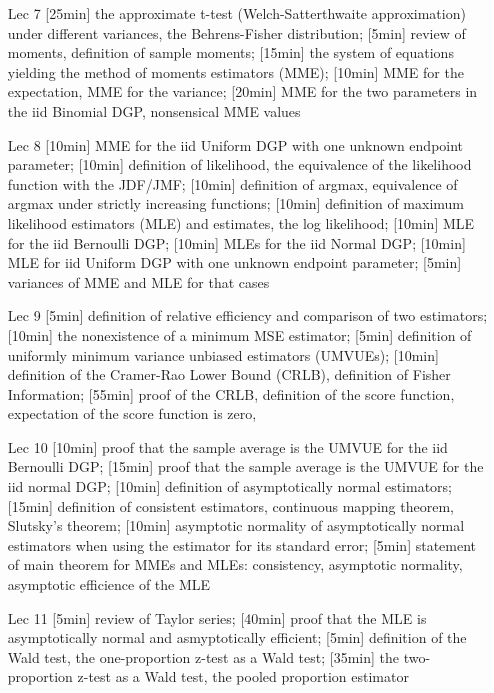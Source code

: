 \begin{enumerate}
\item[Lec 7] [25min] the approximate t-test (Welch-Satterthwaite approximation) under different variances, the Behrens-Fisher distribution; [5min] review of moments, definition of sample moments; [15min] the system of equations yielding the method of moments estimators (MME); [10min] MME for the expectation, MME for the variance; [20min] MME for the two parameters in the iid Binomial DGP, nonsensical MME values

\item[Lec 8] [10min] MME for the iid Uniform DGP with one unknown endpoint parameter; [10min] definition of likelihood, the equivalence of the likelihood function with the JDF/JMF; [10min] definition of argmax, equivalence of argmax under strictly increasing functions; [10min] definition of maximum likelihood estimators (MLE) and estimates, the log likelihood; [10min] MLE for the iid Bernoulli DGP; [10min] MLEs for the iid Normal DGP; [10min] MLE for iid Uniform DGP with one unknown endpoint parameter; [5min] variances of MME and MLE for that cases

\item[Lec 9] [5min] definition of relative efficiency and comparison of two estimators; [10min] the nonexistence of a minimum MSE estimator; [5min] definition of uniformly minimum variance unbiased estimators (UMVUEs); [10min] definition of the Cramer-Rao Lower Bound (CRLB), definition of Fisher Information; [55min] proof of the CRLB, definition of the score function, expectation of the score function is zero,  

\item[Lec 10] [10min] proof that the sample average is the UMVUE for the iid Bernoulli DGP; [15min] proof that the sample average is the UMVUE for the iid normal DGP; [10min] definition of asymptotically normal estimators; [15min] definition of consistent estimators, continuous mapping theorem, Slutsky's theorem; [10min] asymptotic normality of asymptotically normal estimators when using the estimator for its standard error; [5min] statement of main theorem for MMEs and MLEs: consistency, asymptotic normality, asymptotic efficience of the MLE

\item[Lec 11]  [5min] review of Taylor series; [40min] proof that the MLE is asymptotically normal and asmyptotically efficient; [5min] definition of the Wald test, the one-proportion z-test as a Wald test; [35min] the two-proportion z-test as a Wald test, the pooled proportion estimator


\end{enumerate}
